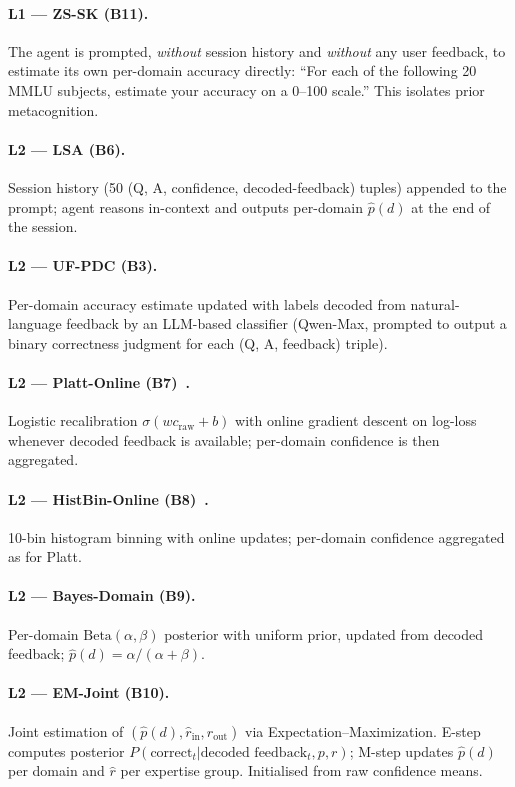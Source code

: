 \documentclass[11pt]{article}
\begin{document}
\paragraph{L1 --- ZS-SK (B11).} The agent is prompted, \emph{without} session history and \emph{without} any user feedback, to estimate its own per-domain accuracy directly: ``For each of the following 20 MMLU subjects, estimate your accuracy on a 0--100 scale.'' This isolates prior metacognition.
\paragraph{L2 --- LSA (B6).} Session history (50 (Q, A, confidence, decoded-feedback) tuples) appended to the prompt; agent reasons in-context and outputs per-domain $\hat p(d)$ at the end of the session.
\paragraph{L2 --- UF-PDC (B3).} Per-domain accuracy estimate updated with labels decoded from natural-language feedback by an LLM-based classifier (Qwen-Max, prompted to output a binary correctness judgment for each (Q, A, feedback) triple).
\paragraph{L2 --- Platt-Online (B7)~\citep{platt1999probabilistic}.} Logistic recalibration $\sigma(w c_{\text{raw}} + b)$ with online gradient descent on log-loss whenever decoded feedback is available; per-domain confidence is then aggregated.
\paragraph{L2 --- HistBin-Online (B8)~\citep{zadrozny2001obtaining}.} 10-bin histogram binning with online updates; per-domain confidence aggregated as for Platt.
\paragraph{L2 --- Bayes-Domain (B9).} Per-domain $\text{Beta}(\alpha, \beta)$ posterior with uniform prior, updated from decoded feedback; $\hat p(d) = \alpha/(\alpha+\beta)$.
\paragraph{L2 --- EM-Joint (B10).} Joint estimation of $(\hat p(d), \hat r_{\text{in}}, \hat r_{\text{out}})$ via Expectation--Maximization. E-step computes posterior $P(\text{correct}_t | \text{decoded feedback}_t, p, r)$; M-step updates $\hat p(d)$ per domain and $\hat r$ per expertise group. Initialised from raw confidence means.
\end{document}
